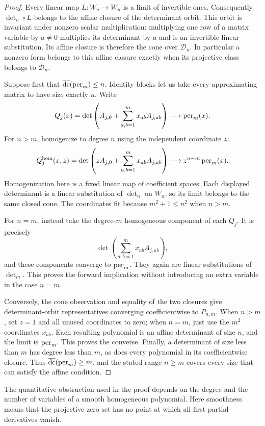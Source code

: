 \begin{proof}
Every linear map $L:W_n\to W_n$ is a limit of invertible ones. Consequently
$\det_n\circ L$ belongs to the affine closure of the determinant orbit.
This orbit is invariant under nonzero scalar multiplication: multiplying
one row of a matrix variable by $a\ne0$ multiplies its determinant by $a$
and is an invertible linear substitution. Its affine closure is therefore
the cone over $\mathcal D_n$. In particular a nonzero form belongs to this
affine closure exactly when its projective class belongs to $\mathcal D_n$.

Suppose first that $\operatorname{\overline{dc}}(\operatorname{per}_m)\le n$. Identity blocks let us take every
approximating matrix to have size exactly $n$. Write
\[
 Q_j(x)=\det\left(A_{j,0}+\sum_{a,b=1}^m x_{ab}A_{j,ab}\right)
 \longrightarrow\operatorname{per}_m(x).
\]
For $n>m$, homogenize to degree $n$ using the independent coordinate $z$:
\[
 Q_j^{\mathrm{hom}}(x,z)=\det\left(zA_{j,0}+\sum_{a,b=1}^m x_{ab}A_{j,ab}\right)
 \longrightarrow z^{n-m}\operatorname{per}_m(x).
\]
Homogenization here is a fixed linear map of coefficient spaces. Each
displayed determinant is a linear substitution of $\det_n$ on $W_n$,
so its limit belongs to the same closed cone. The coordinates fit because
$m^2+1\le n^2$ when $n>m$.

For $n=m$, instead take the degree-$m$ homogeneous component of each $Q_j$.
It is precisely
\[
 \det\left(\sum_{a,b=1}^m x_{ab}A_{j,ab}\right),
\]
and these components converge to $\operatorname{per}_m$. They again are linear
substitutions of $\det_m$. This proves the forward implication without
introducing an extra variable in the case $n=m$.

Conversely, the cone observation and equality of the two closures give
determinant-orbit representatives converging coefficientwise to $P_{n,m}$.
When $n>m$, set $z=1$ and all unused coordinates to zero; when $n=m$, just
use the $m^2$ coordinates $x_{ab}$. Each resulting polynomial is an affine
determinant of size $n$, and the limit is $\operatorname{per}_m$. This proves the converse.
Finally, a determinant of size less than $m$ has degree less than $m$, as
does every polynomial in its coefficientwise closure. Thus
$\operatorname{\overline{dc}}(\operatorname{per}_m)\ge m$, and the stated range $n\ge m$ covers every size
that can satisfy the affine condition.
\end{proof}

The quantitative obstruction used in the proof depends on the degree and
the number of variables of a smooth homogeneous polynomial. Here smoothness
means that the projective zero set has no point at which all first partial
derivatives vanish.

